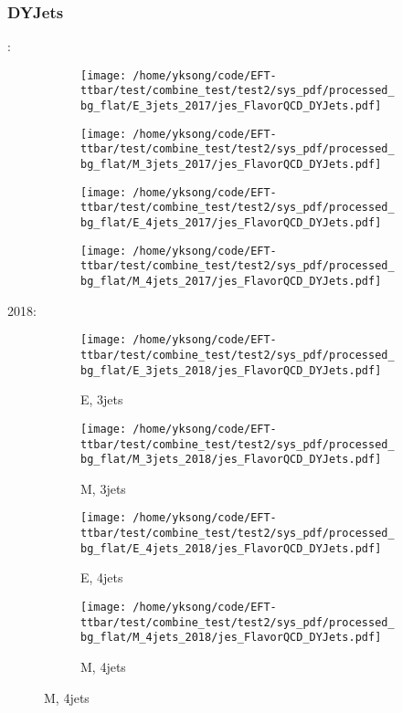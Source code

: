 \documentclass{beamer}
\begin{document}
\begin{frame}
\frametitle{DYJets}
\fontsize{5}{1}:
\begin{figure}
\centering
\begin{subfigure}[b]{0.24\textwidth}
\texttt{[image: /home/yksong/code/EFT-ttbar/test/combine\_test/test2/sys\_pdf/processed\_bg\_flat/E\_3jets\_2017/jes\_FlavorQCD\_DYJets.pdf]}
\end{subfigure}
\begin{subfigure}[b]{0.24\textwidth}
\texttt{[image: /home/yksong/code/EFT-ttbar/test/combine\_test/test2/sys\_pdf/processed\_bg\_flat/M\_3jets\_2017/jes\_FlavorQCD\_DYJets.pdf]}
\end{subfigure}
\begin{subfigure}[b]{0.24\textwidth}
\texttt{[image: /home/yksong/code/EFT-ttbar/test/combine\_test/test2/sys\_pdf/processed\_bg\_flat/E\_4jets\_2017/jes\_FlavorQCD\_DYJets.pdf]}
\end{subfigure}
\begin{subfigure}[b]{0.24\textwidth}
\texttt{[image: /home/yksong/code/EFT-ttbar/test/combine\_test/test2/sys\_pdf/processed\_bg\_flat/M\_4jets\_2017/jes\_FlavorQCD\_DYJets.pdf]}
\end{subfigure}
\end{figure}
2018:
\begin{figure}
\centering
\begin{subfigure}[b]{0.24\textwidth}
\texttt{[image: /home/yksong/code/EFT-ttbar/test/combine\_test/test2/sys\_pdf/processed\_bg\_flat/E\_3jets\_2018/jes\_FlavorQCD\_DYJets.pdf]}
\captionsetup{font=tiny}
\caption{E, 3jets}
\end{subfigure}
\begin{subfigure}[b]{0.24\textwidth}
\texttt{[image: /home/yksong/code/EFT-ttbar/test/combine\_test/test2/sys\_pdf/processed\_bg\_flat/M\_3jets\_2018/jes\_FlavorQCD\_DYJets.pdf]}
\captionsetup{font=tiny}
\caption{M, 3jets}
\end{subfigure}
\begin{subfigure}[b]{0.24\textwidth}
\texttt{[image: /home/yksong/code/EFT-ttbar/test/combine\_test/test2/sys\_pdf/processed\_bg\_flat/E\_4jets\_2018/jes\_FlavorQCD\_DYJets.pdf]}
\captionsetup{font=tiny}
\caption{E, 4jets}
\end{subfigure}
\begin{subfigure}[b]{0.24\textwidth}
\texttt{[image: /home/yksong/code/EFT-ttbar/test/combine\_test/test2/sys\_pdf/processed\_bg\_flat/M\_4jets\_2018/jes\_FlavorQCD\_DYJets.pdf]}
\captionsetup{font=tiny}
\caption{M, 4jets}
\end{subfigure}
\end{figure}
\end{frame}
\end{document}
